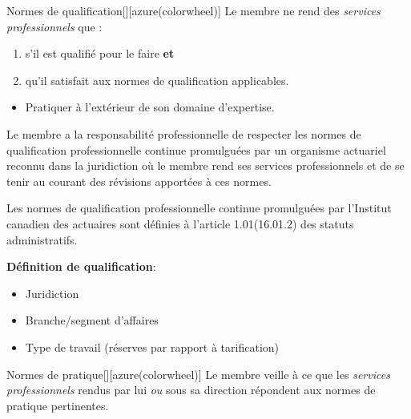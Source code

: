 \documentclass[10pt, french]{article}
\begin{document}
\begin{multicols*}{2}
\begin{definitionGENERAL}{Normes de qualification}[][azure(colorwheel)]
Le membre ne rend des \og \textit{services professionnels} \fg{} que :
\begin{enumerate}
	\item	s'il est qualifié pour le faire \textbf{et} 
	\item	qu'il satisfait aux normes de qualification applicables.
\end{enumerate}

\bigskip

\begin{rappel_enhanced}
\begin{itemize}
	\item	Pratiquer à l'extérieur de son domaine d'expertise.
\end{itemize}
\end{rappel_enhanced}
\end{definitionGENERAL}

\begin{definitionNOHFILLsub}[Annotation 2-1]
Le membre a la responsabilité professionnelle de respecter les normes de qualification professionnelle continue promulguées par un organisme actuariel reconnu dans la juridiction où le membre rend ses services professionnels et de se tenir au courant des révisions apportées à ces normes.

\bigskip

Les \og normes de qualification professionnelle continue \fg{} promulguées par l’Institut canadien des actuaires sont définies à l’article 1.01(16.01.2) des statuts administratifs.

\textbf{Définition de qualification}:
\begin{itemize}
	\item	Juridiction
	\item	Branche/segment d’affaires
	\item	Type de travail (réserves par rapport à tarification)
\end{itemize}
\end{definitionNOHFILLsub}

\bigskip

\begin{definitionGENERAL}{Normes de pratique}[][azure(colorwheel)]
Le membre veille à ce que les \og \textit{services professionnels} \fg{} rendus par lui \textit{ou} sous sa direction répondent aux normes de pratique pertinentes.


\end{definitionGENERAL}
\end{multicols*}
\end{document}
